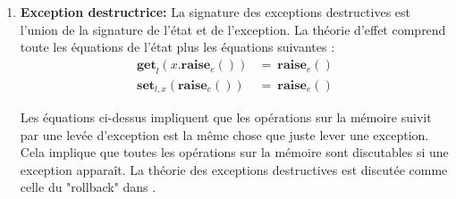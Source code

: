 \begin{exemple}
\begin{enumerate}
		
			\item[] \textbf{Exception destructrice:} La signature des exceptions destructives est l'union de la signature de l'état et de l'exception. La théorie d'effet comprend toute les équations de l'état plus les équations suivantes :  			
			\begin{align*}
				\textbf{get}_l(x.\textbf{raise}_e()) &=~\textbf{raise}_e()\\
				\textbf{set}_{l,x}(\textbf{raise}_{e}()) &=~\textbf{raise}_{e}()
			\end{align*}
			\bigbreak
			
			Les équations ci-dessus impliquent que les opérations sur la mémoire suivit par une levée d'exception est la même chose que juste lever une exception. Cela implique que toutes les opérations sur la mémoire sont discutables si une exception apparaît. La théorie des exceptions destructives est discutée comme celle du "rollback" dans \cite{DBLP:journals/tcs/HylandPP06}.
		\end{enumerate}
	\end{exemple}